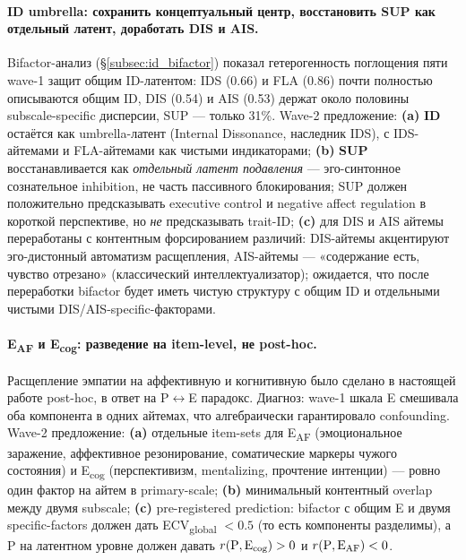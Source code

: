 \paragraph{ID umbrella: сохранить концептуальный центр, восстановить SUP как отдельный латент, доработать DIS и AIS.} Bifactor-анализ (§\ref{subsec:id_bifactor}) показал гетерогенность поглощения пяти wave-1 защит общим ID-латентом: IDS (0.66) и FLA (0.86) почти полностью описываются общим ID, DIS (0.54) и AIS (0.53) держат около половины subscale-specific дисперсии, SUP --- только 31\%. Wave-2 предложение: \textbf{(a)} \textbf{ID} остаётся как umbrella-латент (Internal Dissonance, наследник IDS), с IDS-айтемами и FLA-айтемами как чистыми индикаторами; \textbf{(b)} \textbf{SUP} восстанавливается как \emph{отдельный латент подавления} --- эго-синтонное сознательное inhibition, не часть пассивного блокирования; SUP должен положительно предсказывать executive control и negative affect regulation в короткой перспективе, но \emph{не} предсказывать trait-ID; \textbf{(c)} для DIS и AIS айтемы переработаны с контентным форсированием различий: DIS-айтемы акцентируют эго-дистонный автоматизм расщепления, AIS-айтемы --- «содержание есть, чувство отрезано» (классический интеллектуализатор); ожидается, что после переработки bifactor будет иметь чистую структуру с общим ID и отдельными чистыми DIS/AIS-specific-факторами.

\paragraph{E\textsubscript{AF} и E\textsubscript{cog}: разведение на item-level, не post-hoc.} Расщепление эмпатии на аффективную и когнитивную было сделано в настоящей работе post-hoc, в ответ на P$\leftrightarrow$E парадокс. Диагноз: wave-1 шкала E смешивала оба компонента в одних айтемах, что алгебраически гарантировало confounding. Wave-2 предложение: \textbf{(a)} отдельные item-sets для E\textsubscript{AF} (эмоциональное заражение, аффективное резонирование, соматические маркеры чужого состояния) и E\textsubscript{cog} (перспективизм, mentalizing, прочтение интенции) --- ровно один фактор на айтем в primary-scale; \textbf{(b)} минимальный контентный overlap между двумя subscale; \textbf{(c)} pre-registered prediction: bifactor с общим E и двумя specific-factors должен дать ECV\textsubscript{global} $< 0.5$ (то есть компоненты разделимы), а P на латентном уровне должен давать $r(\text{P}, \text{E\textsubscript{cog}}) > 0$ и $r(\text{P}, \text{E\textsubscript{AF}}) < 0$.

